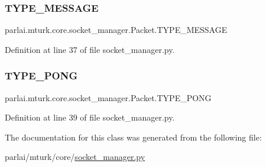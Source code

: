 \subsubsection{\texorpdfstring{T\+Y\+P\+E\+\_\+\+M\+E\+S\+S\+A\+GE}{TYPE\_MESSAGE}}
{\footnotesize\ttfamily parlai.\+mturk.\+core.\+socket\+\_\+manager.\+Packet.\+T\+Y\+P\+E\+\_\+\+M\+E\+S\+S\+A\+GE\hspace{0.3cm}{\ttfamily [static]}}



Definition at line 37 of file socket\+\_\+manager.\+py.

\mbox{\label{classparlai_1_1mturk_1_1core_1_1socket__manager_1_1Packet_ab226c447695e66b324b03b6efa83be3d}} 
\subsubsection{\texorpdfstring{T\+Y\+P\+E\+\_\+\+P\+O\+NG}{TYPE\_PONG}}
{\footnotesize\ttfamily parlai.\+mturk.\+core.\+socket\+\_\+manager.\+Packet.\+T\+Y\+P\+E\+\_\+\+P\+O\+NG\hspace{0.3cm}{\ttfamily [static]}}



Definition at line 39 of file socket\+\_\+manager.\+py.



The documentation for this class was generated from the following file\+:\begin{DoxyCompactItemize}
\item 
parlai/mturk/core/\hyperlink{socket__manager_8py}{socket\+\_\+manager.\+py}\end{DoxyCompactItemize}
